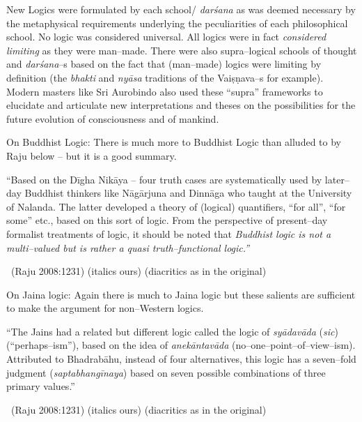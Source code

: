 New Logics were formulated by each school/ \textit{darśana} as was deemed necessary by the metaphysical requirements underlying the peculiarities of each philosophical school. No logic was considered universal. All logics were in fact \textit{considered limiting} as they were man–made. There were also supra–logical schools of thought and \textit{darśana}–s based on the fact that (man–made) logics were limiting by definition (the \textit{bhakti} and \textit{nyāsa} traditions of the Vaiṣṇava–s for example). Modern masters like Sri Aurobindo also used these “supra” frameworks to elucidate and articulate new interpretations and theses on the possibilities for the future evolution of consciousness and of mankind.

\newpage

On Buddhist Logic:  There is much more to Buddhist Logic than alluded to by Raju below – but it is a good summary.

\begin{myquote}
“Based on the Dīgha Nikāya – four truth cases are systematically used by later–day Buddhist thinkers like Nāgārjuna and Dinnāga who taught at the University of Nalanda. The latter developed a theory of (logical) quantifiers, “for all”, “for some” etc., based on this sort of logic. From the perspective of present–day formalist treatments of logic, it should be noted that \textit{Buddhist logic is not a multi–valued but is rather a quasi truth–functional logic.”}

~\hfill (Raju 2008:1231) (italics ours) (diacritics as in the original)
\end{myquote}

On Jaina logic: Again there is much to Jaina logic but these salients are sufficient to make the argument for non–Western logics.

\begin{myquote}
“The Jains had a related but different logic called the logic of \textit{syādavāda} (\textit{sic}) (“perhaps–ism”), based on the idea of \textit{anekāntavāda} (no–one–point–of–view–ism). Attributed to Bhadrabāhu, instead of four alternatives, this logic has a seven–fold judgment (\textit{saptabhangīnaya}) based on seven possible combinations of three primary values.” 

~\hfill (Raju 2008:1231) (italics ours) (diacritics as in the original)
\end{myquote}

